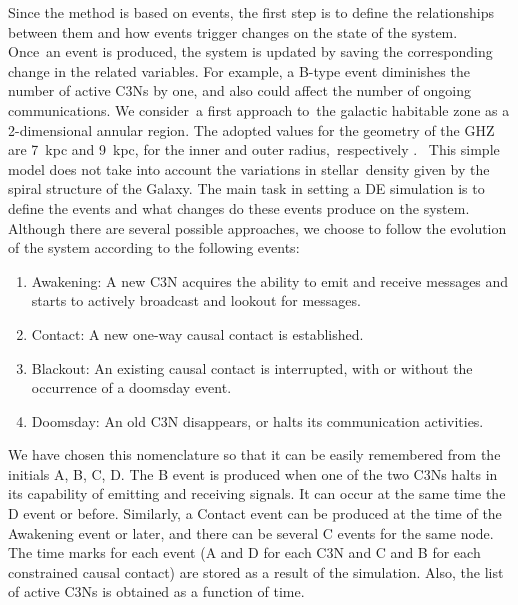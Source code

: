 \documentclass[crop]{CSLB}
\newcommand{\ceti}{C3N}
\newcommand{\cetis}{C3Ns}
\newcommand{\blackout}{B event }
\newcommand{\doomsday}{D event }
\newcommand{\aawakening}{Awakening event }
\newcommand{\ccontact}{Contact event }
\newcommand{\contacts}{C events }
\begin{document}
Since the method is based on events, the first step is to define the
relationships between them and how events trigger changes on the state of the
system.
%
Once an event is produced, the system is updated by saving the corresponding
change in the related variables.
%
For example, a B-type event diminishes the number of active \cetis{} by one,
and also could affect the number of ongoing communications.
%
We consider a first approach to the galactic habitable zone as a 2-dimensional
annular region.
%
The adopted values for the geometry of the GHZ are 7~kpc and 9~kpc, for the
inner and outer radius, respectively \citep{lineweaver_galactic_2004}. 
%
This simple model does not take into account the variations in stellar density
given by the spiral structure of the Galaxy.
%
The main task in setting a DE simulation is to define the events and what
changes do these events produce on the system.
%
Although there are several possible approaches, we choose to follow the
evolution of the system according to the following events:

\begin{enumerate}
   \item[(A)] Awakening: A new \ceti{} acquires the ability to emit
      and receive messages and starts to actively broadcast and
      lookout for messages.
   \item[(C)] Contact: A new one-way causal contact is established.
   \item[(B)] Blackout: An existing causal contact is interrupted,
      with or without the occurrence of a doomsday event.
   \item[(D)] Doomsday: An old \ceti{} disappears, or halts its
      communication activities.
\end{enumerate}

We have chosen this nomenclature so that it can be easily remembered
from the initials A, B, C, D.
%
The \blackout is produced when one of the two \cetis{} halts in its
capability of emitting and receiving signals.
%
It can occur at the same time the \doomsday or before.
%
Similarly, a \ccontact can be produced at the time of the \aawakening
or later, and there can be several \contacts for the same node.
%
The time marks for each event (A and D for each \ceti{} and C and B
for each constrained causal contact) are stored as a result of the simulation.
%
Also, the list of active \cetis{} is obtained as a function of time.
%
\end{document}
